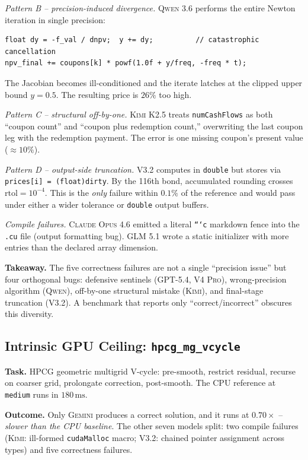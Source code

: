 \documentclass{article}
\begin{document}
\textit{Pattern B -- precision-induced divergence.} \textsc{Qwen 3.6}
performs the entire Newton iteration in single precision:
\begin{lstlisting}[style=cuda,basicstyle=\ttfamily\footnotesize]
float dy = -f_val / dnpv;  y += dy;          // catastrophic cancellation
npv_final += coupons[k] * powf(1.0f + y/freq, -freq * t);
\end{lstlisting}
The Jacobian becomes ill-conditioned and the iterate latches at the
clipped upper bound $y=0.5$. The resulting price is $26\%$ too high.

\textit{Pattern C -- structural off-by-one.} \textsc{Kimi K2.5} treats
\texttt{numCashFlows} as both ``coupon count'' and ``coupon plus
redemption count,'' overwriting the last coupon leg with the
redemption payment. The error is one missing coupon's present value
($\approx 10\%$).

\textit{Pattern D -- output-side truncation.} \textsc{V3.2} computes
in \texttt{double} but stores via \texttt{prices[i] = (float)dirty}.
By the 116th bond, accumulated rounding crosses
$\mathrm{rtol}=10^{-4}$. This is the \emph{only} failure within
$0.1\%$ of the reference and would pass under either a wider
tolerance or \texttt{double} output buffers.

\textit{Compile failures.} \textsc{Claude Opus 4.6} emitted a literal
\texttt{```c} markdown fence into the \texttt{.cu} file (output
formatting bug). \textsc{GLM 5.1} wrote a static initializer with
more entries than the declared array dimension.

\textbf{Takeaway.} The five correctness failures are not a single
``precision issue'' but four orthogonal bugs: defensive sentinels
(\textsc{GPT-5.4}, \textsc{V4 Pro}), wrong-precision algorithm
(\textsc{Qwen}), off-by-one structural mistake (\textsc{Kimi}), and
final-stage truncation (\textsc{V3.2}). A benchmark that reports only
``correct/incorrect'' obscures this diversity.

\subsection{Intrinsic GPU Ceiling: \texttt{hpcg\_mg\_vcycle}}
\label{app:badcase-hpcg}

\textbf{Task.} HPCG geometric multigrid V-cycle: pre-smooth, restrict
residual, recurse on coarser grid, prolongate correction,
post-smooth. The CPU reference at \texttt{medium} runs in
$180\,\mathrm{ms}$.

\textbf{Outcome.} Only \textsc{Gemini} produces a correct solution,
and it runs at $0.70\times$ -- \emph{slower than the CPU baseline}.
The other seven models split: two compile failures
(\textsc{Kimi}: ill-formed \texttt{cudaMalloc} macro;
\textsc{V3.2}: chained pointer assignment across types) and five
correctness failures.
\end{document}
